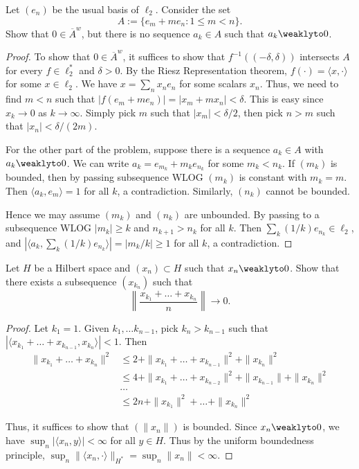 \documentclass{article}
\begin{document}
 Let $(e_n)$ be the usual basis of $\ell_2$. Consider the set
$$A:= \{e_m + me_n : 1 \le m < n\}.$$
Show that $0 \in \overline{A}^w$, but there is no sequence $a_k \in A$ such that $a_k \weaklyto 0$.
\begin{proof}
To show that $0 \in \overline{A}^w$, it suffices to show that $f^{-1}((-\delta, \delta))$ intersects $A$ for every $f \in \ell_2^*$ and $\delta > 0$. By the Riesz Representation theorem,  $f(\cdot) = \langle x, \cdot \rangle$ for some $x \in \ell_2$.  We have $x = \sum_n x_n e_n$ for some scalars $x_n$.  Thus, we need to find $m < n$ such that $|f(e_m + me_n)| = |x_m + mx_n| < \delta$.  This is easy since $x_k \to 0$ as $k \to \infty$.  Simply pick $m$ such that $|x_m| < \delta/2$, then pick $n > m$ such that $|x_n| < \delta/(2m)$.

For the other part of the problem, suppose there is a sequence $a_k \in A$ with $a_k \weaklyto 0$. We can write $a_k = e_{m_k} + m_k e_{n_k}$ for some $m_k < n_k$. If $(m_k)$ is bounded, then by passing subsequence WLOG $(m_k)$ is constant with $m_k = m$.  Then $\langle a_k, e_m \rangle = 1$ for all $k$, a contradiction.  Similarly, $(n_k)$ cannot be bounded.

Hence we may assume $(m_k)$ and $(n_k)$ are unbounded. By passing to a subsequence WLOG $|m_k| \ge k$ and $n_{k+1} > n_k$ for all $k$.  Then $\sum_k (1/k) e_{n_k} \in \ell_2$, and $|\langle a_k, \sum_k (1/k) e_{n_k} \rangle| = |m_k / k| \ge 1$ for all $k$, a contradiction.
\end{proof}


 Let $H$ be a Hilbert space and $(x_n) \subset H$ such that $x_n \weaklyto 0$. Show that there exists a subsequence $(x_{k_n})$ such that
$$ \left\| \frac{x_{k_1} + \ldots + x_{k_n}} {n} \right \| \to 0.$$
\begin{proof}
Let $k_1 = 1$.  Given $k_1, \ldots k_{n-1}$, pick $k_n > k_{n-1}$ such that $|\langle x_{k_1} + \ldots + x_{k_{n-1}}, x_{k_n} \rangle| < 1$.
Then  
\begin{align*}
\| x_{k_1} + \ldots + x_{k_n} \|^2 & \le 2 + \|x_{k_1} + \ldots + x_{k_{n-1}}\|^2 + \|x_{k_n}\|^2
\\ & \le  4 + \|x_{k_1} + \ldots + x_{k_{n-2}}\|^2 + \|x_{k_{n-1}}\| + \|x_{k_n}\|^2
\\ & \ldots
\\ & \le 2n + \|x_{k_1}\|^2 + \ldots + \|x_{k_n}\|^2
\end{align*}

Thus, it suffices to show that $(\|x_n\|)$ is bounded. Since $x_n \weaklyto 0$, we have $\sup_n |\langle x_n, y \rangle| < \infty$ for all $y \in H$. Thus by the uniform boundedness principle, $\sup_n \| \langle x_n, \cdot \rangle \|_{H^*} = \sup_n \|x_n\| < \infty$.  
\end{proof}
\end{document}
